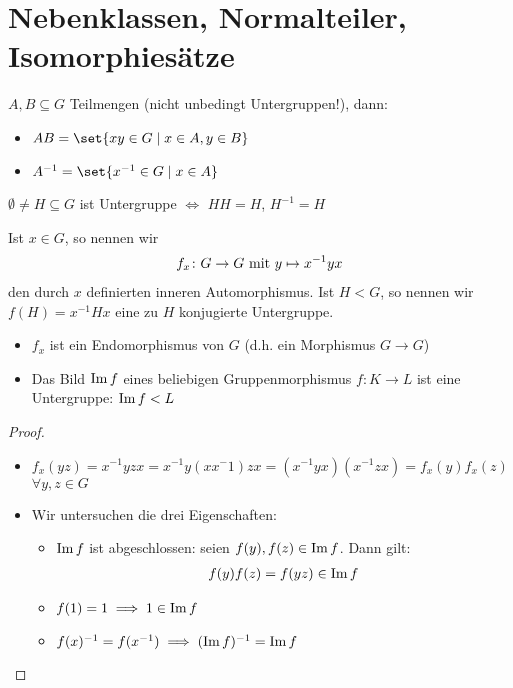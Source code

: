 \section{Nebenklassen, Normalteiler, Isomorphiesätze}
\begin{definition}
	$A,B \subseteq G$ Teilmengen (nicht unbedingt Untergruppen!), dann:
	\begin{itemize}
		\item $AB = \set{xy \in G \mid x \in A, y \in B}$
		\item $A^{-1} = \set{x^{-1} \in G \mid x \in A}$
	\end{itemize}
\end{definition}

\begin{remark}
	$\emptyset \neq H \subseteq G$ ist Untergruppe $\Leftrightarrow$ $HH = H$, $H^{-1} = H$
\end{remark}

\begin{definition}
	Ist $x \in G$, so nennen wir
	\begin{align*}
		f_x\colon G \to G \mit y \mapsto x^{-1}yx
	\end{align*}
	den durch $x$ definierten inneren Automorphismus. Ist $H < G$, so nennen wir $f(H) = x^{-1}Hx$ eine zu $H$ konjugierte Untergruppe.
\end{definition}

\begin{proposition}
	\begin{itemize}
		\item $f_x$ ist ein Endomorphismus von $G$ (d.h. ein Morphismus $G \to G$)
		\item Das Bild $\Image f$ eines beliebigen Gruppenmorphismus $f\colon K \to L$ ist eine Untergruppe: $\Image f < L$
	\end{itemize}
\end{proposition}
\begin{proof}\leavevmode
	\begin{itemize}[topsep=-6pt]
		\item $f_x (yz) = x^{-1}yzx = x^{-1}y(xx{^-1})zx = (x^{-1}yx)(x^{-1}zx) = f_x(y)f_x(z)$ $\forall y,z \in G$
		\item Wir untersuchen die drei Eigenschaften:
		\begin{itemize}
			\item $\Image f$ ist abgeschlossen: seien $f(y), f(z) \in \Image f$. Dann gilt:
			\begin{align*}
			f(y)f(z) = f(yz) \in \Image f
			\end{align*}
			\item $f(1) = 1 \implies 1 \in \Image f$
			\item $f(x)^{-1} = f(x^{-1}) \implies (\Image f)^{-1} = \Image f$
		\end{itemize}
	\end{itemize}
\end{proof}


